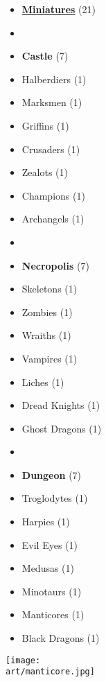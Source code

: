 
\begin{multicols*}{2}

\footnotesize

\begin{itemize}[leftmargin=0pt, label={}, noitemsep]
  \item \textbf{\small{\underline{Miniatures}}} (21)
  \item
  \item \textbf{Castle} (7)
  \item Halberdiers (1)
  \item Marksmen (1)
  \item Griffins (1)
  \item Crusaders (1)
  \item Zealots (1)
  \item Champions (1)
  \item Archangels (1)
  \item
  \item \textbf{Necropolis} (7)
  \item Skeletons (1)
  \item Zombies (1)
  \item Wraiths (1)
  \item Vampires (1)
  \item Liches (1)
  \item Dread Knights (1)
  \item Ghost Dragons (1)
  \item
  \item \textbf{Dungeon} (7)
  \item Troglodytes (1)
  \item Harpies (1)
  \item Evil Eyes (1)
  \item Medusas (1)
  \item Minotaurs (1)
  \item Manticores (1)
  \item Black Dragons (1)
\end{itemize}

\columnbreak

\hspace{-2.75em}
\texttt{[image: \\art/manticore.jpg]}

\end{multicols*}
